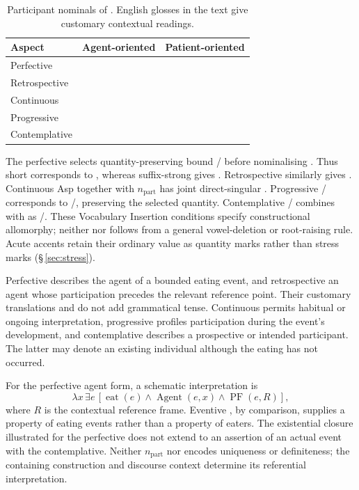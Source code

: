 \begin{table}[htbp]
\footnotesize
\caption{Participant nominals of  . English glosses
in the text give customary contextual readings.}\label{tab:participant-nominals}
\begin{tabularx}{\textwidth}{l L L}
\toprule
Aspect & Agent-oriented & Patient-oriented \\
\midrule
Perfective &  &  \\
Retrospective &  &  \\
Continuous &  &  \\
Progressive &  &  \\
Contemplative &  &  \\
\bottomrule
\end{tabularx}
\end{table}

The perfective selects quantity-preserving bound
/ before nominalising .
Thus short  corresponds to ,
whereas suffix-strong  gives .
Retrospective  similarly gives .
Continuous Asp together with
$n_{\mathrm{part}}$ has joint direct-singular .
Progressive / corresponds to
/, preserving the selected quantity.
Contemplative / combines with 
as /. These Vocabulary Insertion conditions specify constructional
allomorphy; neither  nor  follows from a general
vowel-deletion or root-raising rule. Acute accents retain their ordinary value
as quantity marks rather than stress marks (§\,\ref{sec:stress}).

Perfective  describes the agent of a bounded eating event,
and retrospective  an agent whose participation precedes the
relevant reference point. Their customary translations 
and  do not add grammatical tense. Continuous
 permits habitual or ongoing interpretation, progressive
 profiles participation during the event's development, and
contemplative  describes a prospective or intended
participant. The latter may denote an existing individual although the eating
has not occurred.

For the perfective agent form, a schematic interpretation is
\[
 \lambda x\,\exists e\,[\operatorname{eat}(e)\land
 \operatorname{Agent}(e,x)\land\operatorname{PF}(e,R)],
\]
where $R$ is the contextual reference frame. Eventive , by
comparison, supplies a property of eating events rather than a property of
eaters. The existential closure illustrated for the perfective does not extend
to an assertion of an actual event with the contemplative. Neither
$n_{\mathrm{part}}$ nor  encodes uniqueness or definiteness;
the containing construction and discourse context determine its referential
interpretation.

